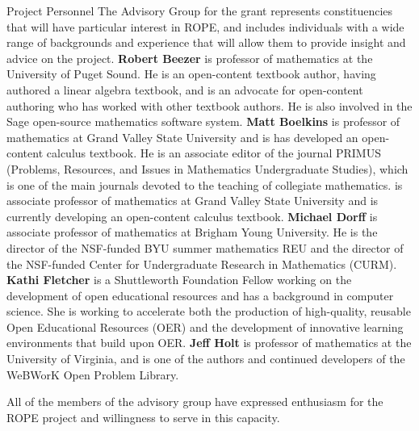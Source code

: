 \documentclass[11pt]{article}
\begin{document}
\begin{section}{Project Personnel}
The Advisory Group for the grant represents constituencies that will have
particular interest in ROPE, and includes individuals with a wide range of
backgrounds and experience that will allow them to provide insight and
advice on the project.  \textbf{Robert Beezer} is professor of mathematics
at the University of Puget Sound.  He is an open-content textbook author,
having authored a linear algebra textbook, and is an advocate for
open-content authoring who has worked with other textbook authors.  He is
also involved in the Sage open-source mathematics software system.
\textbf{Matt Boelkins} is professor of mathematics at Grand Valley State
University and is has developed an open-content calculus textbook.  He is
an associate editor of the journal PRIMUS (Problems, Resources, and Issues
in Mathematics Undergraduate Studies), which is one of the main journals
devoted to the teaching of collegiate mathematics.  is associate professor
of mathematics at Grand Valley State University and is currently
developing an open-content calculus textbook.  \textbf{Michael Dorff} is
associate professor of mathematics at Brigham Young University.  He is the
director of the NSF-funded BYU summer mathematics REU and the director of
the NSF-funded Center for Undergraduate Research in Mathematics (CURM).
\textbf{Kathi Fletcher} is a Shuttleworth Foundation Fellow
working on the development of open educational resources and has a
background in computer science.  She is working to accelerate both the
production of high-quality, reusable Open Educational Resources (OER) and
the development of innovative learning environments that build upon OER.
\textbf{Jeff Holt} is professor of mathematics at the University of
Virginia, and is one of the authors and continued developers of the
WeBWorK Open Problem Library.

All of the members of the advisory group have expressed enthusiasm for the
ROPE project and willingness to serve in this capacity. 


\end{section}
\end{document}
